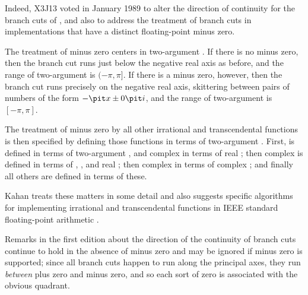 \begin{new}
Indeed, X3J13 voted in January 1989
to alter the direction of continuity for
the branch cuts of , and also
to address the treatment of branch cuts
in implementations that have a distinct floating-point minus zero.

The treatment of minus zero centers in two-argument .
If there is no minus zero, then the branch cut runs just below the negative real
axis as before, and the range of two-argument  is $(-\pi,\pi]$.
If there is a minus zero, however, then the branch cut runs precisely on the negative real
axis, skittering between pairs of numbers of the form $-{\it x}\pm 0{\it i}$,
and the range of two-argument  is $[-\pi,\pi]$.

The treatment of minus zero by all other irrational and transcendental functions
is then specified by defining those functions in terms of two-argument .
First,  is defined in terms of two-argument , and
complex  in terms of real ;
then complex  is defined in terms of , , and real ;
then complex  in terms of complex ;
and finally all others are defined in terms of these.

Kahan \cite{KAHAN-COMPLEX-FNS} treats these matters in some detail and also
suggests specific algorithms for implementing irrational and transcendental functions
in IEEE standard floating-point arithmetic \cite{IEEE-PROPOSED-FLOATING-POINT-STANDARD}.

Remarks in the first edition about the direction of the continuity of branch
cuts continue to hold in the absence of minus zero and may be ignored if minus zero
is supported; since all branch cuts happen to run along the principal axes, they
run {\it between} plus zero and minus zero, and so each sort of zero is associated
with the obvious quadrant.
\end{new}

